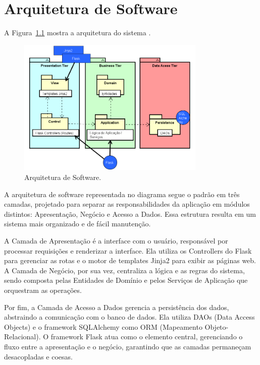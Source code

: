 
\chapter{Arquitetura de Software}
\label{sec-arquitetura}
\vspace{-1cm}

A Figura~\ref{figura-arquitetura} mostra a arquitetura do sistema \emph{\imprimirtitulo}.

\begin{figure}[h]
	\centering
	\includegraphics[width=0.8\textwidth]{figuras/figura_arquitetura.png}
	\caption{Arquitetura de Software.}
	\label{figura-arquitetura}
\end{figure}


A arquitetura de software representada no diagrama segue o padrão em três camadas, projetado para separar as responsabilidades da aplicação em módulos distintos: Apresentação, Negócio e Acesso a Dados. Essa estrutura resulta em um sistema mais organizado e de fácil manutenção.

A Camada de Apresentação é a interface com o usuário, responsável por processar requisições e renderizar a interface. Ela utiliza os Controllers do Flask para gerenciar as rotas e o motor de templates Jinja2 para exibir as páginas web. A Camada de Negócio, por sua vez, centraliza a lógica e as regras do sistema, sendo composta pelas Entidades de Domínio e pelos Serviços de Aplicação que orquestram as operações.

Por fim, a Camada de Acesso a Dados gerencia a persistência dos dados, abstraindo a comunicação com o banco de dados. Ela utiliza DAOs (Data Access Objects) e o framework SQLAlchemy como ORM (Mapeamento Objeto-Relacional). O framework Flask atua como o elemento central, gerenciando o fluxo entre a apresentação e o negócio, garantindo que as camadas permaneçam desacopladas e coesas.